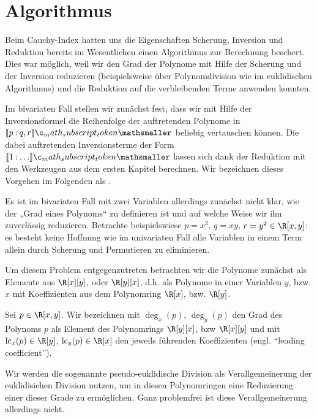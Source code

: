 \documentclass{mythesis}
\begin{document}
\section{Algorithmus}

Beim Cauchy-Index hatten uns die Eigenschaften Scherung, Inversion und Reduktion bereits im Wesentlichen einen Algorithmus zur Berechnung beschert.
Dies war möglich, weil wir den Grad der Polynome mit Hilfe der Scherung und der Inversion reduzieren (beispielsweise über Polynomdivision wie im euklidischen Algorithmus) und die Reduktion auf die verbleibenden Terme anwenden konnten.

Im bivariaten Fall stellen wir zunächst fest, dass wir mit Hilfe der Inversionsformel die Reihenfolge der auftretenden Polynome in $\Index{}{p}{q,r}$ beliebig vertauschen können.
Die dabei auftretenden Inversionsterme der Form $\Index{}{1}{\dotsc}$ lassen sich dank der Reduktion mit den Werkzeugen aus dem ersten Kapitel berechnen.
Wir bezeichnen dieses Vorgehen im Folgenden als .

Es ist im bivariaten Fall mit zwei Variablen allerdings zunächst nicht klar, wie der „Grad eines Polynoms“ zu definieren ist und auf welche Weise wir ihn zuverlässig reduzieren.
Betrachte beispielswiese $p = x^2$, $q = xy$, $r = y^2 \in \R[x,y]$: es besteht keine Hoffnung wie im univariaten Fall alle Variablen in einem Term allein durch Scherung und Permutieren zu eliminieren.

Um diesem Problem entgegenzutreten betrachten wir die Polynome zunächst als Elemente aus $\R[x][y]$, oder $\R[y][x]$, d.h. als Polynome in einer Variablen $y$, bzw. $x$ mit Koeffizienten aus dem Polynomring $\R[x]$, bzw. $\R[y]$.

\begin{definition}
    Sei $p \in \R[x,y]$.
    Wir bezeichnen mit $\deg_x(p)$, $\deg_y(p)$ den Grad des Polynoms $p$ als Element des Polynomrings $\R[y][x]$, bzw $\R[x][y]$ und mit $\lc_x(p) \in \R[y]$, $\lc_y(p) \in \R[x]$ den jeweils führenden Koeffizienten (engl. “leading coefficient”).
\end{definition}

Wir werden die sogenannte pseudo-euklidische Division als Verallgemeinerung der euklidisichen Division nutzen, um in diesen Polynomringen eine Reduzierung einer dieser Grade zu ermöglichen.
Ganz problemfrei ist diese Verallgemeinerung allerdings nicht.
\end{document}
